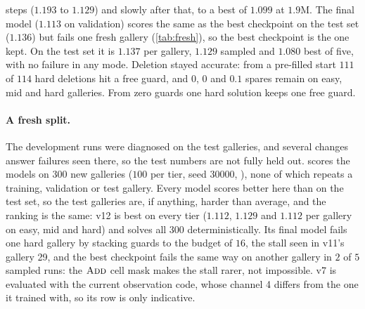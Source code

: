 \documentclass[11pt,a4paper]{article}
\begin{document}
\begin{itemize}
        steps ($1.193$ to $1.129$) and slowly after that, to a best of $1.099$ at $1.9$M. The
        final model ($1.113$ on validation) scores the same as the best checkpoint on the test
        set ($1.136$) but fails one fresh gallery (\cref{tab:fresh}), so the best checkpoint is
        the one kept. On the test set it is $1.137$ per gallery, $1.129$ sampled and $1.080$
        best of five, with no failure in any mode. Deletion stayed accurate: from a pre-filled
        start $111$ of $114$ hard deletions hit a free guard, and $0$, $0$ and $0.1$ spares
        remain on easy, mid and hard galleries. From zero guards one hard solution keeps one
        free guard.
\end{itemize}

\paragraph{A fresh split.} The development runs were diagnosed on the test galleries, and
several changes answer failures seen there, so the test numbers are not fully held out.
 scores the models on $300$ new galleries ($100$ per tier, seed $30000$,
), none of which repeats a training, validation or test gallery.
Every model scores better here than on the test set, so the test galleries are, if anything,
harder than average, and the ranking is the same: v12 is best on every tier ($1.112$, $1.129$
and $1.112$ per gallery on easy, mid and hard) and solves all $300$ deterministically. Its
final model fails one hard gallery by stacking guards to the budget of $16$, the stall seen
in v11's gallery 29, and the best checkpoint fails the same way on another gallery in $2$ of
$5$ sampled runs: the $\textsc{Add}$ cell mask makes the stall rarer, not impossible. v7 is evaluated
with the current observation code, whose channel 4 differs from the one it trained with, so
its row is only indicative.
\end{document}
